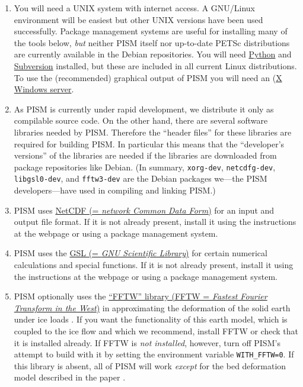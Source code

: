 \documentclass[11pt,final]{amsart}
\begin{document}
\begin{enumerate}
\item You will need a UNIX system with internet access.  A GNU/Linux environment will be easiest but other UNIX versions have been used successfully.  Package management systems are useful for installing many of the tools below, \emph{but} neither PISM itself nor up-to-date PETSc distributions are currently available in the Debian repositories.  You will need \href{http://www.python.org/}{Python} and \href{http://subversion.tigris.org/}{Subversion} installed, but these are included in all current Linux distributions.  To use the (recommended) graphical output of PISM you will need an  (\href{http://www.x.org/}{X Windows server}.
\item As PISM is currently under rapid development, we distribute it only as compilable source code.  On the other hand, there are several software libraries needed by PISM.  Therefore the ``header files'' for these libraries are required for building PISM.  In particular this means that the ``developer's versions'' of the libraries are needed if the libraries are downloaded from package repositories like Debian.  (In summary, \verb|xorg-dev|, \verb|netcdfg-dev|, \verb|libgsl0-dev|, and \verb|fftw3-dev| are the Debian packages we---the PISM developers---have used in compiling and linking PISM.)

\item PISM uses \href{http://www.unidata.ucar.edu/software/netcdf/}{NetCDF (= \emph{network Common Data Form})} for an input and output file format.   If it is not already present, install it using the instructions at the webpage or using a package management system.

\item PISM uses the \href{http://www.gnu.org/software/gsl/}{GSL (= \emph{GNU Scientific Library})} for certain numerical calculations and special functions.  If it is not already present, install it using the instructions at the webpage or using a package management system.

\item PISM optionally uses the \href{http://www.fftw.org/}{``FFTW'' library (FFTW = \emph{Fastest Fourier Transform in the West})} in approximating the deformation of the solid earth under ice loads \cite{BLKfastearth}.  If you want the functionality of this earth model, which is coupled to the ice flow and which we recommend, install FFTW or check that it is installed already.  If FFTW is \emph{not installed}, however, turn off PISM's attempt to build with it by setting the environment variable \verb|WITH_FFTW=0|.   If this library is absent, all of PISM will work \emph{except} for the bed deformation model described in the paper \cite{BLKfastearth}.


\end{enumerate}
\end{document}
